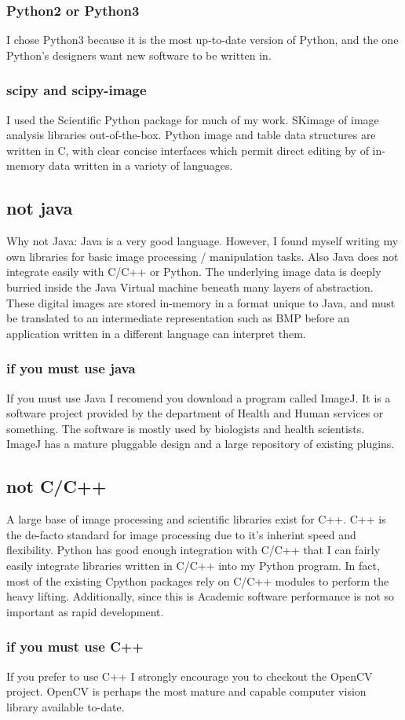 \subsubsection{Python2 or Python3}
I chose Python3 because it is the most up-to-date version of Python, and the one Python's designers want new software to be written in.


\subsubsection{scipy and scipy-image}
I used the Scientific Python package for much of my work. SKimage of image analysis libraries out-of-the-box.  Python image and table data structures are written in C, with clear concise interfaces which permit direct editing by of in-memory data written in a variety of languages.

\subsection{not java}
Why not Java:  Java is a very good language. However, I found myself writing my own libraries for basic image processing / manipulation tasks.  Also Java does not integrate easily with C/C++ or Python.  The underlying image data is deeply burried inside the Java Virtual machine beneath many layers of abstraction. These digital images are stored in-memory in a format unique to Java, and must be translated to an intermediate representation such as BMP before an application written in a different language can interpret them.

\subsubsection{if you must use java}
If you must use Java I recomend you download a program called ImageJ. It is a software project provided by the department of Health and Human services or something.  The software is mostly used by biologists and health scientists. ImageJ has a mature pluggable design and a large repository of existing plugins.

\subsection{not C/C++}
A large base of image processing and scientific libraries exist for C++. C++ is the de-facto standard for image processing due to it's inherint speed and flexibility. Python has good enough integration with C/C++ that I can fairly easily integrate libraries written in C/C++ into my Python program.  In fact, most of the existing Cpython packages rely on C/C++ modules to perform the heavy lifting.  Additionally, since this is Academic software performance is not so important as rapid development.

\subsubsection{if you must use C++}
If you prefer to use C++ I strongly encourage you to checkout the OpenCV project. OpenCV is perhaps the most mature and capable computer vision library  available to-date.

\newpage
